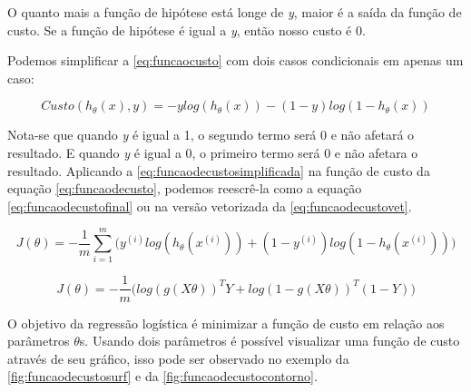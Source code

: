 O quanto mais a função de hipótese está longe de \textit{y}, maior é a saída da função de custo. Se a função de hipótese é igual a \textit{y}, então nosso custo é 0.

Podemos simplificar a \autoref{eq:funcaocusto} com dois casos condicionais em apenas um caso:

\begin{equation} 
\label{eq:funcaodecustosimplificada}
Custo(h_{\theta}(x), y) = -ylog(h_{\theta}(x)) - (1-y)log(1 - h_{\theta}(x))
\end{equation}

Nota-se que quando \textit{y} é igual a 1, o segundo termo será 0 e não afetará o resultado. E quando \textit{y} é igual a 0, o primeiro termo será 0 e não afetara o resultado. Aplicando a \autoref{eq:funcaodecustosimplificada} na função de custo da equação \autoref{eq:funcaodecusto}, podemos reescrê-la como a equação \autoref{eq:funcaodecustofinal} ou na versão vetorizada da \autoref{eq:funcaodecustovet}.

\begin{equation}
\label{eq:funcaodecustofinal}
J(\theta) = - \frac{1}{m}\sum\limits_{i=1}^{m}\Big( y^{(i)}log(h_{\theta}(x^{(i)})) + (1-y^{(i)})log(1 - h_{\theta}(x^{(i)})) \Big)
\end{equation}

\begin{equation}
J(\theta) = - \frac{1}{m}\Big( log(g(X\theta))^TY + log(1 - g(X\theta))^T(1 - Y) \Big) \label{eq:funcaodecustovet}
\end{equation}

O objetivo da regressão logística é minimizar a função de custo em relação aos parâmetros $\theta$s. Usando dois parâmetros é possível visualizar uma função de custo através de seu gráfico, isso pode ser observado no exemplo da \autoref{fig:funcaodecustosurf} e da \autoref{fig:funcaodecustocontorno}. 


